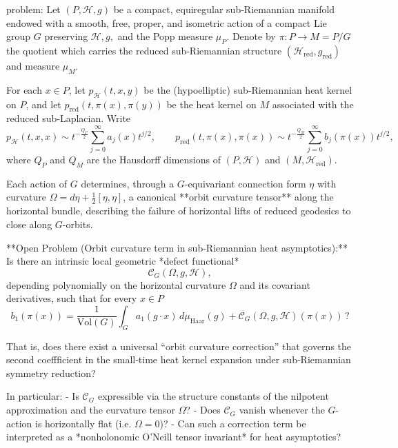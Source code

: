 problem:  
Let \((P,\mathcal{H},g)\) be a compact, equiregular sub‑Riemannian manifold endowed with a smooth, free, proper, and isometric action of a compact Lie group \(G\) preserving \(\mathcal{H}, g,\) and the Popp measure \(\mu_P\).  Denote by \(\pi:P\to M = P/G\) the quotient which carries the reduced sub‑Riemannian structure \((\mathcal{H}_{\mathrm{red}},g_{\mathrm{red}})\) and measure \(\mu_M\).  

For each \(x\in P\), let \(p_{\mathcal{H}}(t,x,y)\) be the (hypoelliptic) sub‑Riemannian heat kernel on \(P\), and let \(p_{\mathrm{red}}(t,\pi(x),\pi(y))\) be the heat kernel on \(M\) associated with the reduced sub‑Laplacian.  Write
\[
p_{\mathcal{H}}(t,x,x)\sim t^{-\frac{Q_P}{2}}\sum_{j=0}^{\infty} a_j(x)t^{j/2},\qquad
p_{\mathrm{red}}(t,\pi(x),\pi(x))\sim t^{-\frac{Q_M}{2}}\sum_{j=0}^{\infty} b_j(\pi(x))t^{j/2},
\]
where \(Q_P\) and \(Q_M\) are the Hausdorff dimensions of \((P,\mathcal{H})\) and \((M,\mathcal{H}_{\mathrm{red}})\).  

Each action of \(G\) determines, through a \(G\)-equivariant connection form \(\eta\) with curvature \(\Omega=d\eta+\tfrac12[\eta,\eta]\), a canonical **orbit curvature tensor** along the horizontal bundle, describing the failure of horizontal lifts of reduced geodesics to close along \(G\)-orbits.

**Open Problem (Orbit curvature term in sub‑Riemannian heat asymptotics):**  
Is there an intrinsic local geometric *defect functional*
\[
\mathcal{C}_G(\Omega, g, \mathcal{H}),
\]
depending polynomially on the horizontal curvature \(\Omega\) and its covariant derivatives, such that for every \(x\in P\)
\[
b_1(\pi(x))
=
\frac{1}{\mathrm{Vol}(G)}\int_G a_1(g\!\cdot\! x)\, d\mu_{\mathrm{Haar}}(g)
+\mathcal{C}_G(\Omega,g,\mathcal{H})(\pi(x))\,?
\]

That is, does there exist a universal “orbit curvature correction” that governs the second coeffficient in the small‑time heat kernel expansion under sub‑Riemannian symmetry reduction?

In particular:
- Is \(\mathcal{C}_G\) expressible via the structure constants of the nilpotent approximation and the curvature tensor \(\Omega\)?
- Does \(\mathcal{C}_G\) vanish whenever the \(G\)-action is horizontally flat (i.e. \(\Omega=0\))?
- Can such a correction term be interpreted as a *nonholonomic O’Neill tensor invariant* for heat asymptotics?


